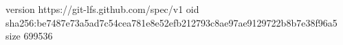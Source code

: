 version https://git-lfs.github.com/spec/v1
oid sha256:be7487e73a5ad7c54cea781e8e52efb212793c8ae97ae9129722b8b7e38f96a5
size 699536
